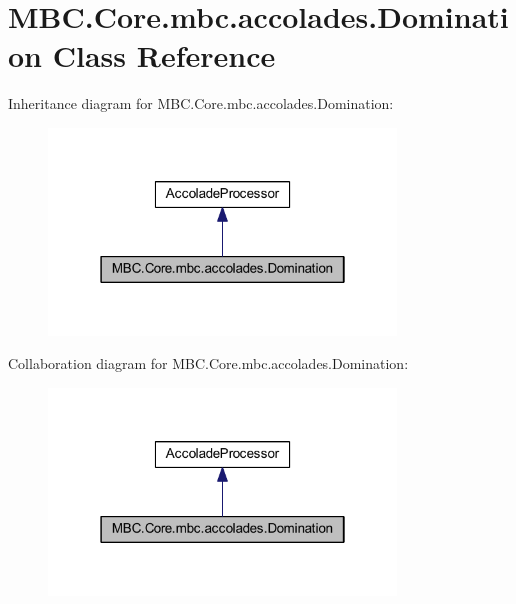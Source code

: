 \hypertarget{class_m_b_c_1_1_core_1_1mbc_1_1accolades_1_1_domination}{\section{M\-B\-C.\-Core.\-mbc.\-accolades.\-Domination Class Reference}
\label{class_m_b_c_1_1_core_1_1mbc_1_1accolades_1_1_domination}
}


Inheritance diagram for M\-B\-C.\-Core.\-mbc.\-accolades.\-Domination\-:\nopagebreak
\begin{figure}[H]
\begin{center}
\leavevmode
\includegraphics[width=262pt]{class_m_b_c_1_1_core_1_1mbc_1_1accolades_1_1_domination__inherit__graph}
\end{center}
\end{figure}


Collaboration diagram for M\-B\-C.\-Core.\-mbc.\-accolades.\-Domination\-:\nopagebreak
\begin{figure}[H]
\begin{center}
\leavevmode
\includegraphics[width=262pt]{class_m_b_c_1_1_core_1_1mbc_1_1accolades_1_1_domination__coll__graph}
\end{center}
\end{figure}
